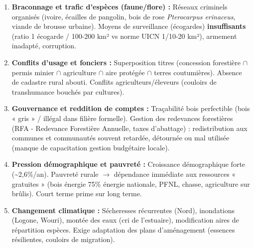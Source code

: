 \documentclass[11pt]{article}
\begin{document}
\begin{attention}
\begin{enumerate}
    \item \textbf{Braconnage et trafic d'espèces (faune/flore) :} Réseaux criminels organisés (ivoire, écailles de pangolin, bois de rose \emph{Pterocarpus erinaceus}, viande de brousse urbaine). Moyens de surveillance (écogardes) \textbf{insuffisants} (ratio 1 écogarde / 100-200 km² vs norme UICN 1/10-20 km²), armement inadapté, corruption.
    \item \textbf{Conflits d'usage et fonciers :} Superposition titres (concession forestière $\cap$ permis minier $\cap$ agriculture $\cap$ aire protégée $\cap$ terres coutumières). Absence de cadastre rural abouti. Conflits agriculteurs/éleveurs (couloirs de transhumance bouchés par cultures).
    \item \textbf{Gouvernance et reddition de comptes :} Traçabilité bois perfectible (bois « gris » / illégal dans filière formelle). Gestion des redevances forestières (RFA - Redevance Forestière Annuelle, taxes d'abattage) : redistribution aux communes et communautés souvent retardée, détournée ou mal utilisée (manque de capacitation gestion budgétaire locale).
    \item \textbf{Pression démographique et pauvreté :} Croissance démographique forte (\textasciitilde 2,6\%/an). Pauvreté rurale $\rightarrow$ dépendance immédiate aux ressources « gratuites » (bois énergie 75\% énergie nationale, PFNL, chasse, agriculture sur brûlis). Court terme prime sur long terme.
    \item \textbf{Changement climatique :} Sécheresses récurrentes (Nord), inondations (Logone, Wouri), montée des eaux (cri de l'estuaire), modification aires de répartition espèces. Exige adaptation des plans d'aménagement (essences résilientes, couloirs de migration).
\end{enumerate}
\end{attention}
\end{document}
